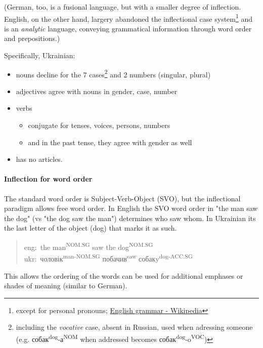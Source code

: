 (German, too, is a fusional language, but with a smaller degree of
inflection. English, on the other hand, largery abandoned the
inflectional case system\footnote{except for personal pronouns;
  \href{https://en.wikipedia.org/wiki/English_grammar}{English grammar -
  Wikipedia}} and is an \emph{analytic} language, conveying grammatical
information through word order and prepositions.)

Specifically, Ukrainian:

\begin{itemize}
\tightlist
\item
  nouns decline for the 7 cases\footnote{including the \emph{vocative}
    case, absent in Russian, used when adressing someone (e.g.
    собак\textsuperscript{dog}-а\textsuperscript{NOM} when addressed becomes
    собак\textsuperscript{dog}-o\textsuperscript{VOC})} and 2 numbers (singular,
  plural)
\item
  adjectives agree with nouns in gender, case, number
\item
  verbs

  \begin{itemize}
  \tightlist
  \item
    conjugate for tenses, voices, persons, numbers
  \item
    and in the past tense, they agree with gender as well
  \end{itemize}
\item
  has no articles.
\end{itemize}

\paragraph{Inflection for word order}\label{inflection-for-word-order}

The standard word order is Subject-Verb-Object (SVO), but the
inflectional paradigm allows free word order. In English the SVO word
order in "the man saw the dog" (vs "the dog saw the man") determines who
saw whom. In Ukrainian it\textquotesingle s the last letter of the
object (dog) that marks it as such.

\begin{quote}
eng: the man\textsuperscript{NOM.SG} saw the dog\textsuperscript{NOM.SG}\\
ukr: чоловік\textsuperscript{man-NOM.SG} побачив\textsuperscript{saw}
собакy\textsuperscript{dog-ACC.SG}
\end{quote}

This allows the ordering of the words can be used for additional
emphases or shades of meaning (similar to German).

